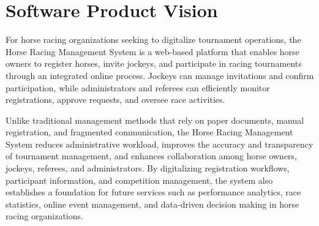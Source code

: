 \section{Software Product Vision}

For horse racing organizations seeking to digitalize tournament operations, the Horse Racing Management System is a web-based platform that enables horse owners to register horses, invite jockeys, and participate in racing tournaments through an integrated online process. Jockeys can manage invitations and confirm participation, while administrators and referees can efficiently monitor registrations, approve requests, and oversee race activities.

Unlike traditional management methods that rely on paper documents, manual registration, and fragmented communication, the Horse Racing Management System reduces administrative workload, improves the accuracy and transparency of tournament management, and enhances collaboration among horse owners, jockeys, referees, and administrators. By digitalizing registration workflows, participant information, and competition management, the system also establishes a foundation for future services such as performance analytics, race statistics, online event management, and data-driven decision making in horse racing organizations.
